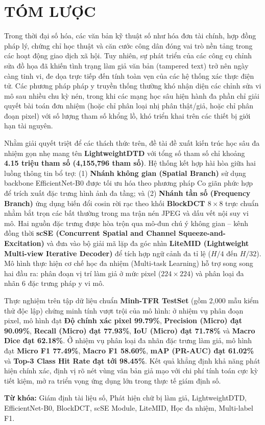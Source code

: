 \chapter{TÓM LƯỢC}
\indent\indent Trong thời đại số hóa, các văn bản kỹ thuật số như hóa đơn tài chính, hợp đồng pháp lý, chứng chỉ học thuật và căn cước công dân đóng vai trò nền tảng trong các hoạt động giao dịch xã hội. Tuy nhiên, sự phát triển của các công cụ chỉnh sửa đồ họa đã khiến tình trạng làm giả văn bản (tampered text) trở nên ngày càng tinh vi, đe dọa trực tiếp đến tính toàn vẹn của các hệ thống xác thực điện tử. Các phương pháp pháp y truyền thống thường khó nhận diện các chỉnh sửa vi mô sau nhiều chu kỳ nén, trong khi các mạng học sâu hiện hành đa phần chỉ giải quyết bài toán đơn nhiệm (hoặc chỉ phân loại nhị phân thật/giả, hoặc chỉ phân đoạn pixel) với số lượng tham số khổng lồ, khó triển khai trên các thiết bị giới hạn tài nguyên.

Nhằm giải quyết triệt để các thách thức trên, đề tài đề xuất kiến trúc học sâu đa nhiệm gọn nhẹ mang tên \textbf{LightweightDTD} với tổng số tham số chỉ khoảng \textbf{4.15 triệu tham số (4,155,796 tham số)}. Hệ thống kết hợp hài hòa giữa hai luồng thông tin bổ trợ: (1) \textbf{Nhánh không gian (Spatial Branch)} sử dụng backbone EfficientNet-B0 được tối ưu hóa theo phương pháp Co giãn phức hợp để trích xuất đặc trưng hình ảnh đa tầng; và (2) \textbf{Nhánh tần số (Frequency Branch)} ứng dụng biến đổi cosin rời rạc theo khối \textbf{BlockDCT $8 \times 8$} trực chuẩn nhằm bắt trọn các bất thường trong ma trận nén JPEG và dấu vết nội suy vi mô. Hai nguồn đặc trưng được hòa trộn qua mô-đun chú ý không gian -- kênh đồng thời \textbf{scSE (Concurrent Spatial and Channel Squeeze-and-Excitation)} và đưa vào bộ giải mã lặp đa góc nhìn \textbf{LiteMID (Lightweight Multi-view Iterative Decoder)} để tích hợp ngữ cảnh đa tỉ lệ ($H/4$ đến $H/32$). Mô hình thực hiện cơ chế học đa nhiệm (Multi-task Learning) hỗ trợ song song hai đầu ra: phân đoạn vị trí làm giả ở mức pixel ($224 \times 224$) và phân loại đa nhãn 6 đặc trưng pháp y vi mô.

Thực nghiệm trên tập dữ liệu chuẩn \textbf{Minh-TFR TestSet} (gồm 2,000 mẫu kiểm thử độc lập) chứng minh tính vượt trội của mô hình: ở nhiệm vụ phân đoạn pixel, mô hình đạt \textbf{Độ chính xác pixel 99.79\%}, \textbf{Precision (Micro) đạt 90.09\%}, \textbf{Recall (Micro) đạt 77.93\%}, \textbf{IoU (Micro) đạt 71.78\%} và \textbf{Macro Dice đạt 62.18\%}. Ở nhiệm vụ phân loại đa nhãn đặc trưng làm giả, mô hình đạt \textbf{Micro F1 77.49\%}, \textbf{Macro F1 58.60\%}, \textbf{mAP (PR-AUC) đạt 61.02\%} và \textbf{Top-3 Class Hit Rate đạt tới 98.45\%}. Kết quả khẳng định khả năng phát hiện chính xác, định vị rõ nét vùng văn bản giả mạo với chi phí tính toán cực kỳ tiết kiệm, mở ra triển vọng ứng dụng lớn trong thực tế giám định số.\vspace{0.3cm}

\textbf{Từ khóa:} Giám định tài liệu số, Phát hiện chữ bị làm giả, LightweightDTD, EfficientNet-B0, BlockDCT, scSE Module, LiteMID, Học đa nhiệm, Multi-label F1.
